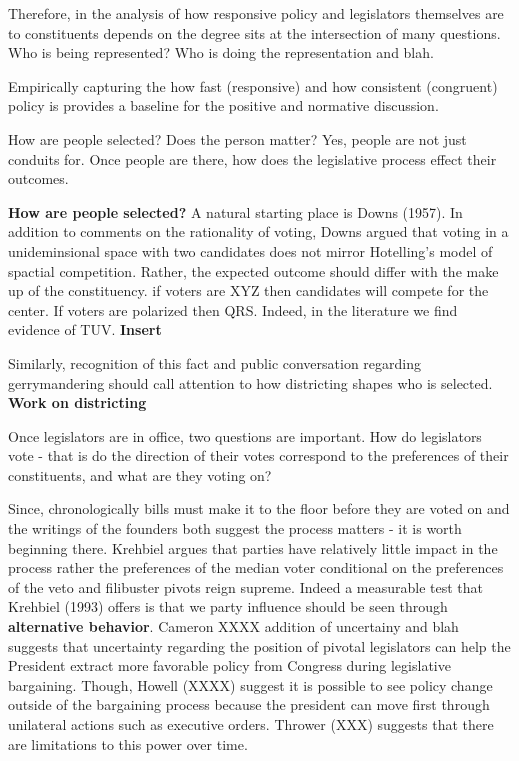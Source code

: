 \documentclass[10pt,letterpaper]{article}
\begin{document}

Therefore, in the analysis of how responsive policy and legislators themselves are to constituents depends on the degree sits at the intersection of many questions. Who is being represented? Who is doing the representation and blah.

Empirically capturing the how fast (responsive) and how consistent (congruent) policy is provides a baseline for the positive and normative discussion. 


How are people selected? Does the person matter? Yes, people are not just conduits for. Once people are there, how does the legislative process effect their outcomes. 

\textbf{How are people selected?} A natural starting place is Downs (1957). In addition to comments on the rationality of voting, Downs argued that voting in a unideminsional space with two candidates does not mirror Hotelling's model of spactial competition. Rather, the expected outcome should differ with the make up of the constituency. if voters are XYZ then candidates will compete for the center. If voters are polarized then QRS. Indeed, in the literature we find evidence of TUV. \textbf{Insert} %

Similarly, recognition of this fact and public conversation regarding gerrymandering should call attention to how districting shapes who is selected. \textbf{Work on districting}

Once legislators are in office, two questions are important. How do legislators vote - that is do the direction of their votes correspond to the preferences of their constituents, and what are they voting on?

Since, chronologically bills must make it to the floor before they are voted on and the writings of the founders both suggest the process matters - it is worth beginning there. Krehbiel argues that parties have relatively little impact in the process rather the preferences of the median voter conditional on the preferences of the veto and filibuster pivots reign supreme. Indeed a measurable test that Krehbiel (1993) offers is that we party influence should be seen through \textbf{alternative behavior}. Cameron XXXX addition of uncertainy and blah suggests that uncertainty regarding the position of pivotal legislators can help the President extract more favorable policy from Congress during legislative bargaining. Though, Howell (XXXX) suggest it is possible to see policy change outside of the bargaining process because the president can move first through unilateral actions such as executive orders. Thrower (XXX) suggests that there are limitations to this power over time.
\end{document}
